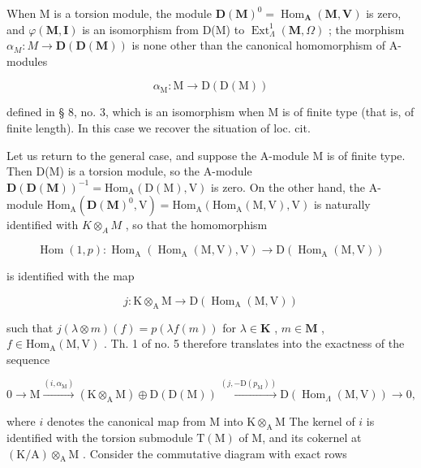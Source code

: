 When M is a torsion module, the module \(\mathbf{D}(\mathbf{M})^{0} = \operatorname{Hom}_{\mathbf{A}}(\mathbf{M}, \mathbf{V})\) is zero, and \(\varphi(\mathbf{M}, \mathbf{I})\) is an isomorphism from D(M) to \(\operatorname{Ext}_{\Lambda}^{1}(\mathbf{M}, \Omega)\) ; the morphism \(\alpha_{M}: M \to \mathbf{D}(\mathbf{D}(\mathbf{M}))\) is none other than the canonical homomorphism of A-modules

\[
\alpha_ {\mathrm{M}}: \mathrm{M} \longrightarrow \mathrm{D} (\mathrm{D(M)})
\]

defined in § 8, no. 3, which is an isomorphism when M is of finite type (that is, of finite length). In this case we recover the situation of loc. cit.

Let us return to the general case, and suppose the A-module M is of finite type. Then D(M) is a torsion module, so the A-module \(\mathbf{D}(\mathbf{D}(\mathbf{M}))^{-1} = \mathrm{Hom}_{\mathrm{A}}(\mathrm{D}(\mathrm{M}), \mathrm{V})\) is zero. On the other hand, the A-module \(\mathrm{Hom}_{\mathrm{A}}(\mathbf{D}(\mathbf{M})^{0}, \mathrm{V}) = \mathrm{Hom}_{\mathrm{A}}(\mathrm{Hom}_{\mathrm{A}}(\mathrm{M}, \mathrm{V}), \mathrm{V})\) is naturally identified with \(K \otimes_{A} M\) , so that the homomorphism

\[
\operatorname{Hom} (1, p): \operatorname{Hom} _ {\mathrm{A}} (\operatorname{Hom} _ {\mathrm{A}} (\mathrm{M}, \mathrm{V}), \mathrm{V}) \longrightarrow \mathrm{D} (\operatorname{Hom} _ {\mathrm{A}} (\mathrm{M}, \mathrm{V}))
\]

is identified with the map

\[
j: \mathrm{K} \otimes_ {\mathrm{A}} \mathrm{M} \longrightarrow \mathrm{D} (\operatorname{Hom} _ {\mathrm{A}} (\mathrm{M}, \mathrm{V}))
\]

such that \(j(\lambda \otimes m)(f) = p(\lambda f(m))\) for \(\lambda \in \mathbf{K}\) , \(m \in \mathbf{M}\) , \(f \in \mathrm{Hom}_{\mathrm{A}}(\mathrm{M},\mathrm{V})\) . Th. 1 of no. 5 therefore translates into the exactness of the sequence

\[
0 \longrightarrow \mathrm{M} \xrightarrow {(i , \alpha_ {\mathrm{M}})} (\mathrm{K} \otimes_ {\mathrm{A}} \mathrm{M}) \oplus \mathrm{D} (\mathrm{D} (\mathrm{M})) \xrightarrow {(j , - \mathrm{D} (p _ {\mathrm{M}}))} \mathrm{D} (\operatorname{Hom} _ {\Lambda} (\mathrm{M}, \mathrm{V})) \longrightarrow 0,
\]

where \(i\) denotes the canonical map from M into \(\mathrm{K} \otimes_{\mathrm{A}} \mathrm{M}\) The kernel of \(i\) is identified with the torsion submodule \(\mathrm{T(M)}\) of M, and its cokernel at \((\mathrm{K/A}) \otimes_{\mathrm{A}} \mathrm{M}\) . Consider the commutative diagram with exact rows

